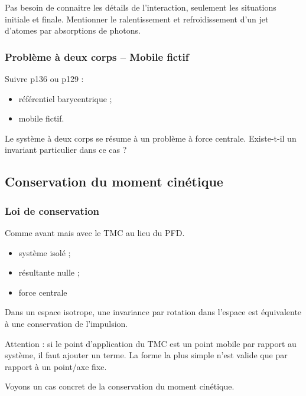 \begin{transition}
Pas besoin de connaitre les détails de l'interaction, seulement les situations initiale et finale.
Mentionner le ralentissement et refroidissement d'un jet d'atomes par absorptions de photons.
\end{transition}

\subsubsection{Problème à deux corps -- Mobile fictif}

Suivre \cite{Faroux1996} p136 ou \cite{Bocquet2002} p129 :
\begin{itemize}
\item référentiel barycentrique ;
\item mobile fictif.
\end{itemize}

\begin{transition}
Le système à deux corps se résume à un problème à force centrale.
Existe-t-il un invariant particulier dans ce cas ?
\end{transition}

\subsection{Conservation du moment cinétique}

\subsubsection{Loi de conservation}

Comme avant mais avec le TMC au lieu du PFD.
\begin{itemize}
\item système isolé ;
\item résultante nulle ;
\item force centrale
\end{itemize}

Dans un espace isotrope, une invariance par rotation dans l'espace est équivalente à une conservation de l'impulsion.

\begin{remarque}
Attention : si le point d'application du TMC est un point mobile par rapport au système, il faut ajouter un terme.
La forme la plus simple n'est valide que par rapport à un point/axe fixe.
\end{remarque}

\begin{transition}
Voyons un cas concret de la conservation du moment cinétique.
\end{transition}

